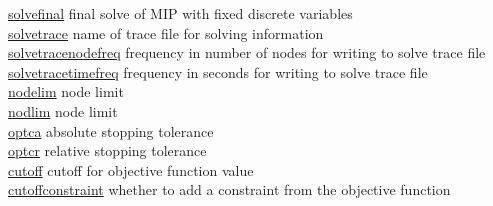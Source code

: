 \begin{tabbing}
\hyperlink{solvefinal}
{solvefinal} \> final solve of MIP with fixed discrete variables \\
\hyperlink{solvetrace}
{solvetrace} \> name of trace file for solving information \\
\hyperlink{solvetracenodefreq}
{solvetracenodefreq} \> frequency in number of nodes for writing to solve trace file \\
\hyperlink{solvetracetimefreq}
{solvetracetimefreq} \> frequency in seconds for writing to solve trace file \\
\hyperlink{nodelim}
{nodelim} \> node limit \\
\hyperlink{nodlim}
{nodlim} \> node limit \\
\hyperlink{optca}
{optca} \> absolute stopping tolerance \\
\hyperlink{optcr}
{optcr} \> relative stopping tolerance \\
\hyperlink{cutoff}
{cutoff} \> cutoff for objective function value \\
\hyperlink{cutoffconstraint}
{cutoffconstraint} \> whether to add a constraint from the objective function
\end{tabbing}


